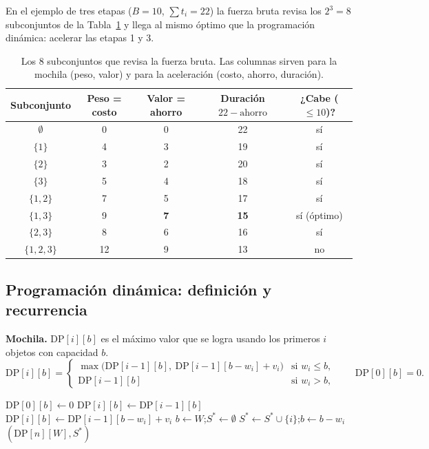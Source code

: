 \documentclass[11pt,a4paper]{article}
\newcommand{\DP}[2]{\mathrm{DP}[#1][#2]}
\newcommand{\sh}{\cellcolor{celda}}
\theoremstyle{plano}
\begin{document}
En el ejemplo de tres etapas ($B=10$, $\sum t_i=22$) la fuerza bruta revisa los $2^3=8$ subconjuntos de la Tabla~\ref{tab:fb} y llega al mismo óptimo que la programación dinámica: acelerar las etapas 1 y 3.

\begin{table}[h]
\centering\small
\begin{tabular}{ccccc}
\toprule
Subconjunto & Peso = costo & Valor = ahorro & Duración $22-\text{ahorro}$ & ¿Cabe ($\le 10$)? \\
\midrule
$\emptyset$ & 0 & 0 & 22 & sí \\
$\{1\}$ & 4 & 3 & 19 & sí \\
$\{2\}$ & 3 & 2 & 20 & sí \\
$\{3\}$ & 5 & 4 & 18 & sí \\
$\{1,2\}$ & 7 & 5 & 17 & sí \\
\sh $\{1,3\}$ & \sh 9 & \sh \textbf{7} & \sh \textbf{15} & \sh sí (óptimo) \\
$\{2,3\}$ & 8 & 6 & 16 & sí \\
$\{1,2,3\}$ & 12 & 9 & 13 & no \\
\bottomrule
\end{tabular}
\caption{Los 8 subconjuntos que revisa la fuerza bruta. Las columnas sirven para la mochila (peso, valor) y para la aceleración (costo, ahorro, duración).}
\label{tab:fb}
\end{table}

\subsection{Programación dinámica: definición y recurrencia}

\textbf{Mochila.} $\DP{i}{b}$ es el máximo valor que se logra usando los primeros $i$ objetos con capacidad $b$.
\begin{equation}
  \DP{i}{b}=
  \begin{cases}
    \max\bigl(\DP{i-1}{b},\ \DP{i-1}{b-w_i}+v_i\bigr) & \text{si } w_i\le b,\\
    \DP{i-1}{b} & \text{si } w_i>b,
  \end{cases}
  \qquad \DP{0}{b}=0.
\end{equation}

\begin{algorithm}[h]
\caption{\textsc{Mochila-DP}$(w,v,W,n)$}
\begin{algorithmic}[1]
 \State $\DP{0}{b}\gets 0$ \EndFor
{}
    \State $\DP{i}{b}\gets\DP{i-1}{b}$
    \If{$w_i\le b$ \textbf{y} $\DP{i-1}{b-w_i}+v_i>\DP{i-1}{b}$}
      \State $\DP{i}{b}\gets\DP{i-1}{b-w_i}+v_i$
    \EndIf
  \EndFor
\EndFor
\State $b\gets W$;\quad $S^*\gets\emptyset$
  \If{$\DP{i}{b}\ne\DP{i-1}{b}$} \State $S^*\gets S^*\cup\{i\}$;\quad $b\gets b-w_i$ \EndIf
\EndFor
\State \Return $(\DP{n}{W},S^*)$
\end{algorithmic}
\end{algorithm}
\end{document}
